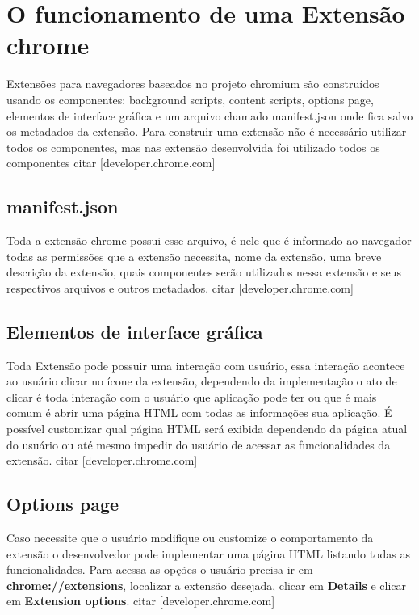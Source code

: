 \documentclass[conference]{IEEEtran}
\begin{document}
    
\section{O funcionamento de uma Extensão chrome} \label{howChromeExtensionWorks} 
Extensões para navegadores baseados no projeto chromium são construídos usando os componentes:  background scripts, content scripts, options page, 
elementos de interface gráfica e um arquivo chamado manifest.json onde fica salvo os metadados da extensão. Para construir uma extensão não é necessário utilizar todos os componentes, mas nas extensão desenvolvida foi utilizado todos os componentes citar [developer.chrome.com]

\subsection{manifest.json}\label{manifest} 
Toda a extensão chrome possui esse arquivo, é nele que é informado ao navegador todas as permissões que a extensão necessita, nome da extensão, uma breve descrição da extensão, quais componentes serão utilizados nessa extensão e seus respectivos arquivos e outros metadados. citar [developer.chrome.com]

\subsection{Elementos de interface gráfica}\label{uiElements} 
Toda Extensão pode possuir uma interação com usuário, essa interação acontece ao usuário clicar no ícone da extensão, dependendo da implementação o ato de clicar
é toda interação com o usuário que aplicação pode ter ou que é mais comum é abrir uma página HTML com todas as informações sua aplicação. É possível customizar qual página HTML será exibida dependendo da página atual do usuário ou até mesmo impedir do usuário de acessar as funcionalidades da extensão. citar [developer.chrome.com]

\subsection{Options page}\label{optionsPage} 
Caso necessite que o usuário modifique ou customize o comportamento da extensão o desenvolvedor pode implementar uma página HTML listando todas as
funcionalidades. Para acessa as opções o usuário precisa ir em \textbf{chrome://extensions}, localizar a extensão desejada, clicar em \textbf{Details} e clicar em
\textbf{Extension options}. citar [developer.chrome.com]
\end{document}
